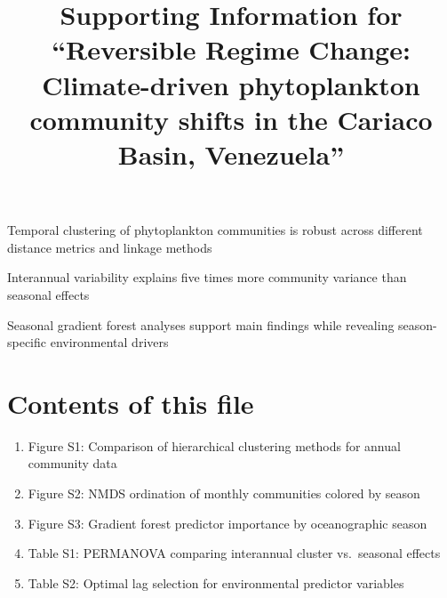 \documentclass{agujournal2019}
\begin{document}
\renewcommand{\thefigure}{S\arabic{figure}}
\renewcommand{\thetable}{S\arabic{table}}

\title{Supporting Information for ``Reversible Regime Change: Climate-driven phytoplankton community shifts in the Cariaco Basin, Venezuela''}




\begin{keypoints}
\item Temporal clustering of phytoplankton communities is robust across different distance metrics and linkage methods
\item Interannual variability explains five times more community variance than seasonal effects
\item Seasonal gradient forest analyses support main findings while revealing season-specific environmental drivers
\end{keypoints}

\section*{Contents of this file}
\begin{enumerate}
\item Figure S1: Comparison of hierarchical clustering methods for annual community data
\item Figure S2: NMDS ordination of monthly communities colored by season
\item Figure S3: Gradient forest predictor importance by oceanographic season
\item Table S1: PERMANOVA comparing interannual cluster vs.\ seasonal effects
\item Table S2: Optimal lag selection for environmental predictor variables
\end{enumerate}
\end{document}
